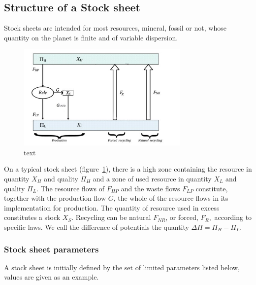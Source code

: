 \documentclass[12pt,a4paper]{article}%
\begin{document}
\subsection{Structure of a Stock sheet}
\label{sec:StockSheet}

Stock sheets are intended for most resources, mineral, fossil or not, whose quantity on the planet is finite and of variable dispersion.

\begin{figure}[h]
	\centering
	\includegraphics[width=0.75\textwidth]{figures/FeuilleStock.jpg}
	\caption{text}
	\label{fig:StockSheet}
\end{figure}

On a typical stock sheet (figure~\ref{fig:StockSheet}), there is a high zone containing the resource in quantity $X_{H}$ and quality $\Pi_{H}$ and a zone of used resource in quantity $X_{L}$ and quality $\Pi_{L}$. The resource flows of $F_{HP}$ and the waste flows $F_{LP}$ constitute, together with the production flow $G$, the whole of the resource flows in its implementation for production.
The quantity of resource used in excess constitutes a stock $X_{S}$. Recycling can be natural $F_{NR}$, or forced, $F_{R},$ according to specific laws. We call the difference of potentials the quantity $\Delta \Pi=\Pi_{H}-\Pi_{L}$.



\subsubsection{Stock sheet parameters}

A stock sheet is initially defined by the set of limited parameters listed below, values are given as an example.
\end{document}
